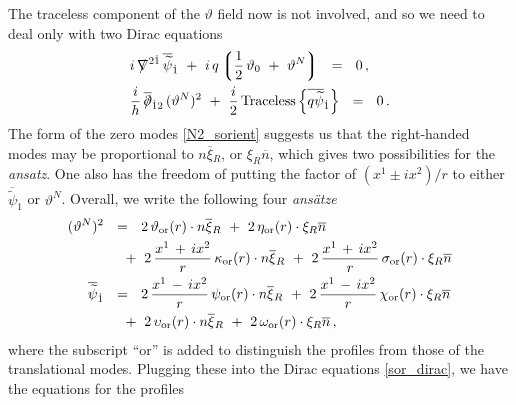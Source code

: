 \documentclass[12pt]{article}
\def\Tr{{\rm Tr}}
\newcommand{\p}{\partial}
\newcommand{\wt}{\widetilde}
\newcommand{\ov}{\overline}
\newcommand{\lgr}{\left\lgroup}
\newcommand{\rgr}{\right\rgroup}
\def\slashed#1{\setbox0=\hbox{$#1$}             %
   \dimen0=\wd0                                 %
   \setbox1=\hbox{/} \dimen1=\wd1               %
   \ifdim\dimen0>\dimen1                        %
      \rlap{\hbox to \dimen0{\hfil/\hfil}}      %
      #1                                        %
   \else                                        %
      \rlap{\hbox to \dimen1{\hfil$#1$\hfil}}   %
      /                                         %
   \fi}                                        %
\newcommand{\bxir}{\ov{\xi}{}_R}
\newcommand{\xir}{\xi_R}
\newcommand{\nbar}{\ov{n}}
\newcommand{\tor}{\vartheta_{\rm or}}
\newcommand{\eor}{\eta_{\rm or}}
\newcommand{\kor}{\kappa_{\rm or}}
\newcommand{\sor}{\sigma_{\rm or}}
\newcommand{\por}{\psi_{\rm or}}
\newcommand{\cor}{\chi_{\rm or}}
\newcommand{\uor}{\upsilon_{\rm or}}
\newcommand{\oor}{\omega_{\rm or}}
\begin{document}
	The traceless component of the $ \vartheta $ field now is not involved, and so we
	need to deal only with two Dirac equations
\begin{align}
\label{sor_dirac}
%
&
\notag
	i\, \slashed{\nabla}^{2\dot{1}}\, \ov{\wt\psi}{}_{\dot 1}  
		~+~  i\, q \lgr \frac{1}{2}\, \vartheta_0  ~+~ \vartheta^N \rgr ~~=~~ 0\,, \\
%
&
	\frac{i}{h}\, \ov{\slashed{\p}}{}_{\dot{1}2}\, (\vartheta^N)^2
		~+~ \frac{i}{2}\, {\rm Traceless} \left\{ \ov{q \wt{\psi}}{}_{\dot 1} \right\} ~~=~~ 0\,.
\end{align}
	The form of the zero modes \eqref{N2_sorient} suggests us that the right-handed modes may be proportional
	to $ n\bxir $, or $ \xir\nbar $, which gives two possibilities for the {\it ansatz}.
	One also has the freedom of putting the factor of $ (x^1 \pm ix^2)/r $ to either 
	$ \ov{\wt \psi}{}_{\dot 1} $ or  $ \vartheta^N $.
	Overall, we write the following four {\it ans\"atze}
%
\begin{align*}
%
	(\vartheta^N)^2  & ~~=~~ 2\,\tor(r)\cdot n\bxir ~+~  2\,\eor(r) \cdot \xir \nbar \\
			& \quad
			~+~ 2\,\frac{x^1\,+\,ix^2}{r}\, \kor(r) \cdot n\bxir 
			~+~ 2\,\frac{x^1\,+\,ix^2}{r}\, \sor(r) \cdot \xir\nbar \\
%	
	\ov{\wt{\psi}}{}_{\dot 1} & ~~=~~ 2\, \frac{x^1\,-\,ix^2}{r}\, \por(r)\cdot n\bxir 
				      ~+~ 2\, \frac{x^1\,-\,ix^2}{r}\, \cor(r)\cdot \xir\nbar \\
				& \quad
				          ~+~ 2\, \uor(r)\cdot n\bxir
					  ~+~ 2\, \oor(r)\cdot \xir\nbar\,,
\end{align*}
	where the subscript ``or'' is added to distinguish the profiles from those of the translational modes. 
	Plugging these into the Dirac equations \eqref{sor_dirac}, we have the equations for the profiles
\end{document}
